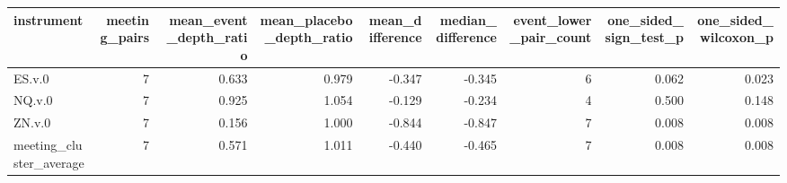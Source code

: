 \begin{tabular}{lrrrrrrrr}
\toprule
instrument & meeting_pairs & mean_event_depth_ratio & mean_placebo_depth_ratio & mean_difference & median_difference & event_lower_pair_count & one_sided_sign_test_p & one_sided_wilcoxon_p \\
\midrule
ES.v.0 & 7 & 0.633 & 0.979 & -0.347 & -0.345 & 6 & 0.062 & 0.023 \\
NQ.v.0 & 7 & 0.925 & 1.054 & -0.129 & -0.234 & 4 & 0.500 & 0.148 \\
ZN.v.0 & 7 & 0.156 & 1.000 & -0.844 & -0.847 & 7 & 0.008 & 0.008 \\
meeting_cluster_average & 7 & 0.571 & 1.011 & -0.440 & -0.465 & 7 & 0.008 & 0.008 \\
\bottomrule
\end{tabular}

